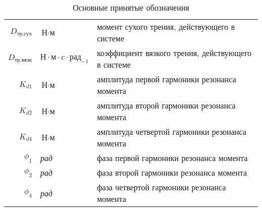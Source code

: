 \begin{table}[ht!]
\begin{tabular}{rll}
    $D_{\textit{тр.сух}}$           & $\textit{Н} \cdot \textit{м}$             & момент сухого трения, действующего в системе \\

    $D_{\textit{тр.вязк}}$          & $\textit{Н} \cdot \textit{м} \cdot \textit{c} \cdot \textit{рад}_{-1}$ & коэффициент вязкого трения, действующего в системе \\

    $K_{d1}$                        & $\textit{Н} \cdot \textit{м}$             & амплитуда первой гармоники резонанса момента \\

    $K_{d2}$                        & $\textit{Н} \cdot \textit{м}$             & амплитуда второй гармоники резонанса момента \\

    $K_{d4}$                        & $\textit{Н} \cdot \textit{м}$             & амплитуда четвертой гармоники резонанса момента \\

    $\phi_{1}$                      & \textit{рад}                              & фаза первой гармоники резонанса момента \\

    $\phi_{2}$                      & \textit{рад}                              & фаза второй гармоники резонанса момента \\

    $\phi_{4}$                      & \textit{рад}                              & фаза четвертой гармоники резонанса момента \\

    \end{tabular}
    \caption{ Основные принятые обозначения }
\end{table}
